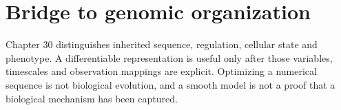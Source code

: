 \section{Bridge to genomic organization}
Chapter 30 distinguishes inherited sequence, regulation, cellular state and
phenotype. A differentiable representation is useful only after those variables,
timescales and observation mappings are explicit. Optimizing a numerical sequence
is not biological evolution, and a smooth model is not a proof that a biological
mechanism has been captured.
